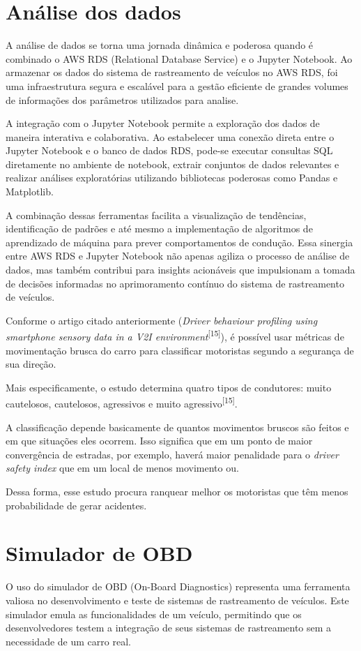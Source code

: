 \section{Análise dos dados}
A análise de dados se torna uma jornada dinâmica e poderosa quando é combinado o AWS RDS (Relational Database Service) e o Jupyter Notebook. Ao armazenar os dados do sistema de rastreamento de veículos no AWS RDS, foi uma infraestrutura segura e escalável para a gestão eficiente de grandes volumes de informações dos parâmetros utilizados para analise. 

A integração com o Jupyter Notebook permite a exploração dos dados de maneira interativa e colaborativa. Ao estabelecer uma conexão direta entre o Jupyter Notebook e o banco de dados RDS, pode-se executar consultas SQL diretamente no ambiente de notebook, extrair conjuntos de dados relevantes e realizar análises exploratórias utilizando bibliotecas poderosas como Pandas e Matplotlib. 

A combinação dessas ferramentas facilita a visualização de tendências, identificação de padrões e até mesmo a implementação de algoritmos de aprendizado de máquina para prever comportamentos de condução. Essa sinergia entre AWS RDS e Jupyter Notebook não apenas agiliza o processo de análise de dados, mas também contribui para insights acionáveis que impulsionam a tomada de decisões informadas no aprimoramento contínuo do sistema de rastreamento de veículos.

Conforme o artigo citado anteriormente (\textit{Driver behaviour profiling using smartphone sensory data in a V2I environment}\textsuperscript{[15]}), é possível usar métricas de movimentação brusca do carro para classificar motoristas segundo a segurança de sua direção.

Mais especificamente, o estudo determina quatro tipos de condutores: muito cautelosos, cautelosos, agressivos e muito agressivo\textsuperscript{[15]}.

A classificação depende basicamente de quantos movimentos bruscos são feitos e em que situações eles ocorrem. Isso significa que em um ponto de maior convergência de estradas, por exemplo, haverá maior penalidade para o \textit{driver safety index} que em um local de menos movimento ou.

Dessa forma, esse estudo procura ranquear melhor os motoristas que têm menos probabilidade de gerar acidentes.

\section{Simulador de OBD}
O uso do simulador de OBD (On-Board Diagnostics) representa uma ferramenta valiosa no desenvolvimento e teste de sistemas de rastreamento de veículos. Este simulador emula as funcionalidades de um veículo, permitindo que os desenvolvedores testem a integração de seus sistemas de rastreamento sem a necessidade de um carro real.

